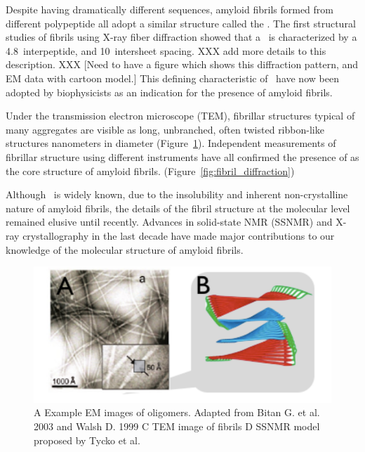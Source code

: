 
Despite having dramatically different sequences, amyloid fibrils formed from different polypeptide all adopt a similar structure called the \crossbs.  The first structural studies of fibrils using X-ray fiber diffraction showed that a \crossb\ is characterized by a 4.8\angstrom\ interpeptide, and 10\angstrom\ intersheet spacing. XXX add more details to this description. XXX [Need to have a figure which shows this diffraction pattern, and EM data with cartoon model.] This defining characteristic of \crossb\ have now been adopted by biophysicists as an indication for the presence of amyloid fibrils.


Under the transmission electron microscope (TEM), fibrillar structures typical of many aggregates are visible as long, unbranched, often twisted ribbon-like structures nanometers in diameter (Figure~\ref{fig:fibril_TEM_SSNMR}). Independent measurements of fibrillar structure using different instruments have all confirmed the presence of \crossbs as the core structure of amyloid fibrils. (Figure~\ref{fig:fibril_diffraction})


Although \crossb\ is widely known, due to the insolubility and inherent non-crystalline nature of amyloid fibrils, the details of the fibril structure at the molecular level remained elusive until recently. Advances in solid-state NMR (SSNMR) and X-ray crystallography in the last decade have made major contributions to our knowledge of the molecular structure of amyloid fibrils.

\begin{figure}
  \centering
  \includegraphics[width=6in]{figures/introduction/fibril_TEM_SSNMR.pdf}
  \caption[Characteristic cross-$\beta$ spacings from X-ray fibre diffraction studies of amyloid fibrils]{A Example EM images of oligomers.  Adapted from Bitan G. et al. 2003 and Walsh D. 1999 C TEM image of fibrils D SSNMR model proposed by Tycko et al.}
  \label{fig:fibril_TEM_SSNMR}
\end{figure}

